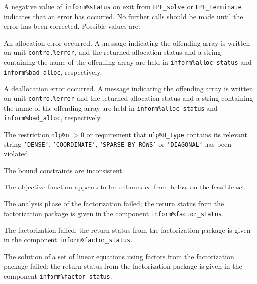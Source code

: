 \documentclass{galahad}
\newcommand{\packagename}{EPF}
\begin{document}

\galerrors
A negative value of {\tt inform\%status} on exit from
{\tt \packagename\_solve}
or
{\tt \packagename\_terminate}
indicates that an error has occurred. No further calls should be made
until the error has been corrected. Possible values are:

\begin{description}

 An allocation error occurred.
A message indicating the offending
array is written on unit {\tt control\%error}, and the returned allocation
status and a string containing the name of the offending array
are held in {\tt inform\%alloc\_\-status}
and {\tt inform\%bad\_alloc}, respectively.

 A deallocation error occurred.
A message indicating the offending
array is written on unit {\tt control\%error} and the returned allocation
status and a string containing the name of the offending array
are held in {\tt inform\%alloc\_\-status}
and {\tt inform\%bad\_alloc}, respectively.

  The restriction {\tt nlp\%n} $> 0$
  or requirement that {\tt nlp\%H\_type} contains its relevant string
  {\tt 'DENSE'}, {\tt 'COORDINATE'}, {\tt 'SPARSE\_BY\_ROWS'}
  or {\tt 'DIAGONAL'}
  has been violated.


 The bound constraints are inconsistent.

  The objective function appears to be unbounded
 from below on the feasible set.

 The analysis phase of the factorization failed;
 the return status from the factorization
    package is given in the component {\tt inform\%fac\-t\-or\_status}.

 The factorization failed;
 the return status from the factorization
    package is given in the component {\tt inform\%fac\-t\-or\_status}.

 The solution of a set of linear equations
 using factors from the factorization package failed;
 the return status from the factorization
    package is given in the component {\tt inform\%fac\-t\-or\_status}.


\end{description}
\end{document}
